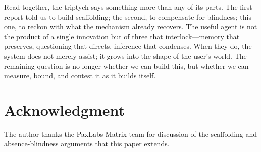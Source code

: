 \documentclass[conference]{IEEEtran}
\theoremstyle{definition}
\begin{document}
Read together, the triptych says something more than any of its parts. The first report told us to build scaffolding; the second, to compensate for blindness; this one, to reckon with what the mechanism already recovers. The useful agent is not the product of a single innovation but of three that interlock---memory that preserves, questioning that directs, inference that condenses. When they do, the system does not merely assist; it grows into the shape of the user's world. The remaining question is no longer whether we can build this, but whether we can measure, bound, and contest it as it builds itself.

\section*{Acknowledgment}
The author thanks the PaxLabs Matrix team for discussion of the scaffolding and absence-blindness arguments that this paper extends.
\end{document}
